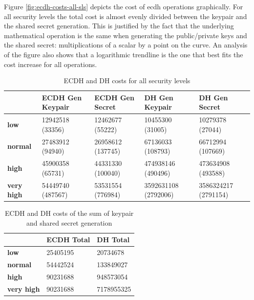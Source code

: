 \documentclass{llncs}
\begin{document}
Figure \ref{fig:ecdh-costs-all-sls} depicts the cost of \gls{ecdh} operations graphically. For all security levels the total cost is almost
evenly divided between the keypair and the shared secret generation. This is justified by the fact that the underlying mathematical operation is
the same when generating the public/private keys and the shared secret: multiplications of a scalar by a point on the curve. An analysis of the figure
also shows that a logarithmic trendline is the one that best fits the cost increase for all operations.

\begin{table}[]
\begin{tabular}{|l|l|l|l|l|}
\hline
                   & \textbf{ECDH Gen Keypair} & \textbf{ECDH Gen Secret} & \textbf{DH Gen Keypair} & \textbf{DH Gen Secret} \\ \hline
\textbf{low}       & 12942518 (33356)          & 12462677 (55222)         & 10455300 (31005)        & 10279378 (27044)       \\ \hline
\textbf{normal}    & 27483912 (94940)          & 26958612 (137745)        & 67136033 (108793)       & 66712994 (107669)      \\ \hline
\textbf{high}      & 45900358 (65731)          & 44331330 (100040)        & 474938146 (490496)      & 473634908 (493588)     \\ \hline
\textbf{very high} & 54449740 (487567)         & 53531554 (776984)        & 3592631108 (2792006)    & 3586324217 (2791154)   \\ \hline
\end{tabular}
\centering \caption{\label{table:ecdh-dh-costs-all-sls} ECDH and DH costs for all security levels}
\end{table}

\begin{table}[]
\begin{tabular}{|l|l|l|}
\hline
                   & \textbf{ECDH Total} & \textbf{DH Total} \\ \hline
\textbf{low}       & 25405195            & 20734678          \\ \hline
\textbf{normal}    & 54442524            & 133849027         \\ \hline
\textbf{high}      & 90231688            & 948573054         \\ \hline
\textbf{very high} & 90231688            & 7178955325        \\ \hline
\end{tabular}
\centering \caption{\label{table:ecdh-dh-costs-total-all-sls} ECDH and DH costs of the sum of keypair and shared secret generation}
\end{table}
\end{document}
